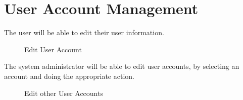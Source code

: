 \documentclass[12pt]{article}
\begin{document}
\newpage
\section{User Account Management}

The user will be able to edit their user information.
\begin{figure}[H]
\centering	
{}
\caption{Edit User Account}

\end{figure}

The system administrator will be able to edit user accounts, by selecting an account and doing the appropriate action.
\begin{figure}[H]
\centering	
{}
\caption{Edit other User Accounts}

\end{figure}
\end{document}
